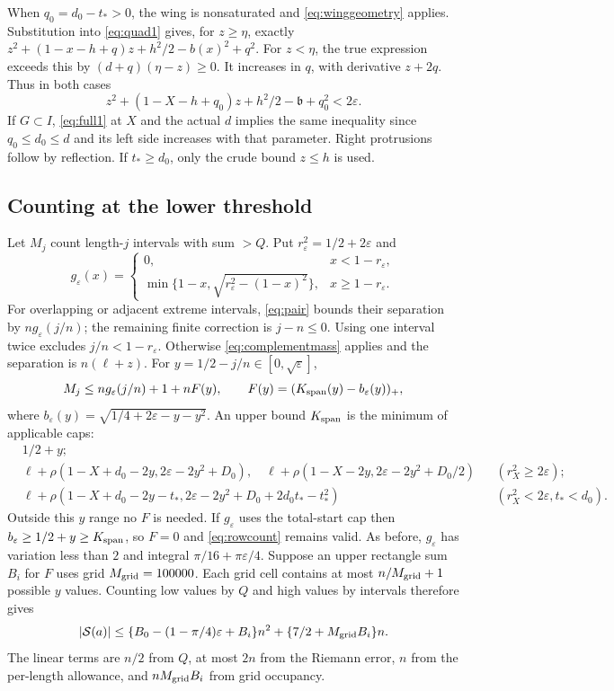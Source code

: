 \documentclass[10pt]{amsart}
\theoremstyle{remark}
\newcommand{\Sset}{\mathcal S}
\begin{document}
When $q_0=d_0-t_*>0$, the wing is nonsaturated and
\eqref{eq:winggeometry} applies. Substitution into \eqref{eq:quad1}
gives, for $z\ge\eta$, exactly
$z^2+(1-x-h+q)z+h^2/2-b(x)^2+q^2$.
For $z<\eta$, the true expression exceeds this by
$(d+q)(\eta-z)\ge0$. It increases in $q$, with derivative $z+2q$.
Thus in both cases
\begin{equation}\label{eq:coupledgap}
 z^2+(1-X-h+q_0)z+h^2/2-\mathfrak b+q_0^2<2\varepsilon.
\end{equation}
If $G\subset I$, \eqref{eq:full1} at $X$ and the actual $d$ implies
the same inequality since $q_0\le d_0\le d$ and its left side
increases with that parameter. Right protrusions follow by reflection.
If $t_*\ge d_0$, only the crude bound $z\le h$ is used.

\subsection{Counting at the lower threshold}
Let $M_j$ count length-$j$ intervals with sum $>Q$. Put
$r_\varepsilon^2=1/2+2\varepsilon$ and
\[
 g_\varepsilon(x)=\begin{cases}0,&x<1-r_\varepsilon,\\
 \min\{1-x,\sqrt{r_\varepsilon^2-(1-x)^2}\},&x\ge1-r_\varepsilon.
 \end{cases}
\]
For overlapping or adjacent extreme intervals, \eqref{eq:pair}
bounds their separation by $ng_\varepsilon(j/n)$; the remaining
finite correction is $j-n\le0$. Using one interval twice excludes
$j/n<1-r_\varepsilon$. Otherwise \eqref{eq:complementmass} applies
and the separation is $n(\ell+z)$. For $y=1/2-j/n\in[0,\sqrt\varepsilon]$,
\begin{equation}\label{eq:rowcount}
 M_j\le ng_\varepsilon(j/n)+1+nF(y),\qquad
 F(y)=(K_{\rm span}(y)-b_\varepsilon(y))_+,
\end{equation}
where $b_\varepsilon(y)=\sqrt{1/4+2\varepsilon-y-y^2}$.
An upper bound $K_{\rm span}$ is the minimum of applicable caps:
\begin{align*}
 &1/2+y;\\
 &\ell+\rho(1-X+d_0-2y,2\varepsilon-2y^2+D_0),\quad
  \ell+\rho(1-X-2y,2\varepsilon-2y^2+D_0/2)
     &&(r_X^2\ge2\varepsilon);\\
 &\ell+\rho(1-X+d_0-2y-t_*,
   2\varepsilon-2y^2+D_0+2d_0t_*-t_*^2)
     &&(r_X^2<2\varepsilon, t_*<d_0).
\end{align*}
Outside this $y$ range no $F$ is needed. If $g_\varepsilon$ uses the
total-start cap then $b_\varepsilon\ge1/2+y\ge K_{\rm span}$, so
$F=0$ and \eqref{eq:rowcount} remains valid.
As before, $g_\varepsilon$ has variation less than $2$ and integral
$\pi/16+\pi\varepsilon/4$. Suppose an upper rectangle sum $B_i$
for $F$ uses grid $M_{\rm grid}=100000$. Each grid cell contains at
most $n/M_{\rm grid}+1$ possible $y$ values. Counting low values by
$Q$ and high values by intervals therefore gives
\begin{equation}\label{eq:lowerthreshold}
 |\Sset(a)|\le\{B_0-(1-\pi/4)\varepsilon+B_i\}n^2
       +\{7/2+M_{\rm grid}B_i\}n.
\end{equation}
The linear terms are $n/2$ from $Q$, at most $2n$ from the Riemann
error, $n$ from the per-length allowance, and $nM_{\rm grid}B_i$
from grid occupancy.
\end{document}
